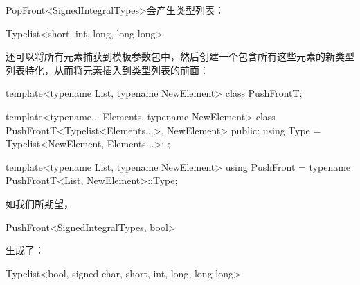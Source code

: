 PopFront<SignedIntegralTypes>会产生类型列表：

\begin{cpp}
Typelist<short, int, long, long long>
\end{cpp}

还可以将所有元素捕获到模板参数包中，然后创建一个包含所有这些元素的新类型列表特化，从而将元素插入到类型列表的前面：

\begin{cpp}
template<typename List, typename NewElement>
class PushFrontT;

template<typename... Elements, typename NewElement>
class PushFrontT<Typelist<Elements...>, NewElement> {
	public:
	using Type = Typelist<NewElement, Elements...>;
};

template<typename List, typename NewElement>
using PushFront = typename PushFrontT<List, NewElement>::Type;
\end{cpp}

如我们所期望，

\begin{cpp}
PushFront<SignedIntegralTypes, bool>
\end{cpp}

生成了：

\begin{cpp}
Typelist<bool, signed char, short, int, long, long long>
\end{cpp}










